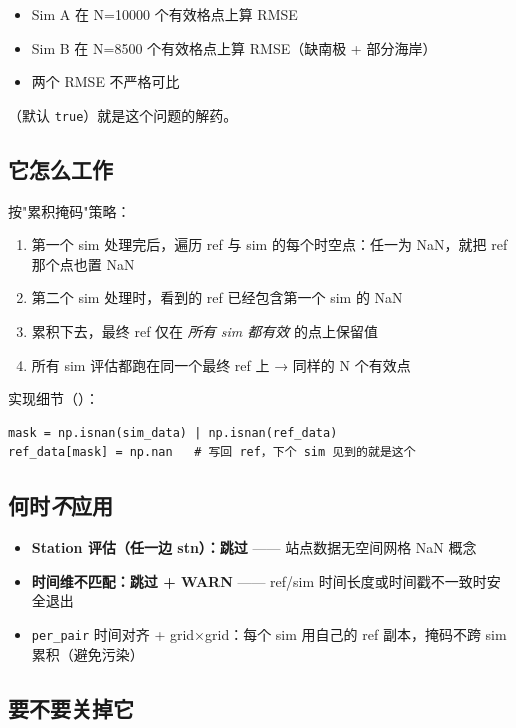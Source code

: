 \begin{itemize}
  \item Sim A 在 N=10000 个有效格点上算 RMSE
  \item Sim B 在 N=8500 个有效格点上算 RMSE（缺南极 + 部分海岸）
  \item 两个 RMSE 不严格可比
\end{itemize}

（默认 \texttt{true}）就是这个问题的解药。

\subsection{它怎么工作}

按"累积掩码"策略：

\begin{enumerate}
  \item 第一个 sim 处理完后，遍历 ref 与 sim 的每个时空点：任一为 NaN，就把 ref 那个点也置 NaN
  \item 第二个 sim 处理时，看到的 ref 已经包含第一个 sim 的 NaN
  \item 累积下去，最终 ref 仅在 \emph{所有 sim 都有效} 的点上保留值
  \item 所有 sim 评估都跑在同一个最终 ref 上 → 同样的 N 个有效点
\end{enumerate}

实现细节（）：

\begin{verbatim}
mask = np.isnan(sim_data) | np.isnan(ref_data)
ref_data[mask] = np.nan   # 写回 ref，下个 sim 见到的就是这个
\end{verbatim}

\subsection{何时\emph{不}应用}

\begin{itemize}
  \item \textbf{Station 评估（任一边 stn）：跳过} —— 站点数据无空间网格 NaN 概念
  \item \textbf{时间维不匹配：跳过 + WARN} —— ref/sim 时间长度或时间戳不一致时安全退出
  \item \texttt{per\_pair} 时间对齐 + grid×grid：每个 sim 用自己的 ref 副本，掩码不跨 sim 累积（避免污染）
\end{itemize}

\subsection{要不要关掉它}


